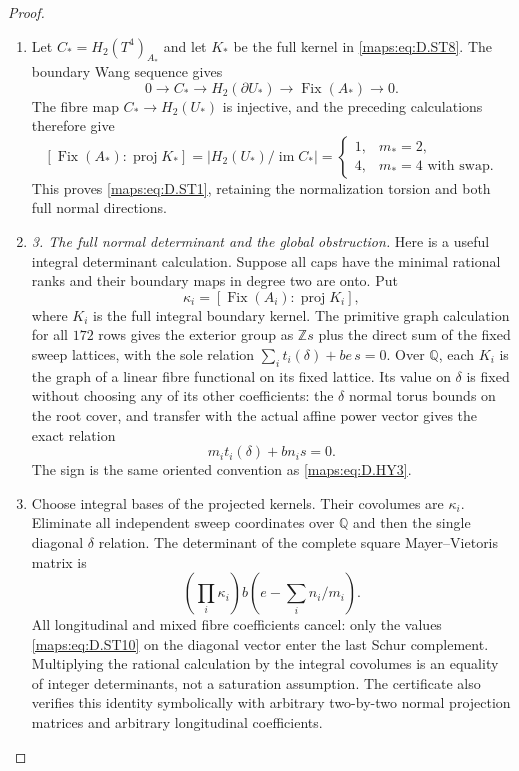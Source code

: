 \begin{proof}
\begin{enumerate}[label=\arabic*.,leftmargin=*]
\item Let $C_*=H_2(T^4)_{A_*}$ and let $K_*$ be the full kernel in
\eqref{maps:eq:D.ST8}. The boundary Wang sequence gives
\[
 0\longrightarrow C_*\longrightarrow H_2(\partial U_*)
        \longrightarrow\operatorname{Fix}(A_*)
        \longrightarrow0.
\]
The fibre map $C_*\to H_2(U_*)$ is injective, and the preceding
calculations therefore give
\[
 [\operatorname{Fix}(A_*):\operatorname{proj}K_*]
 =\bigl|H_2(U_*)/\operatorname{im}C_*\bigr|
 =\begin{cases}1,&m_*=2,\\4,&m_*=4\text{ with swap}.
   \end{cases}                                             \tag{D.ST9}\label{maps:eq:D.ST9}
\]
This proves \eqref{maps:eq:D.ST1}, retaining the normalization torsion and
both full normal directions.

\item \emph{3. The full normal determinant and the global obstruction.}
Here is a useful integral determinant calculation. Suppose all
caps have the minimal rational ranks and their boundary maps
in degree two are onto. Put
\[
 \kappa_i=[\operatorname{Fix}(A_i):
                         \operatorname{proj}K_i],
\]
where $K_i$ is the full integral boundary kernel. The primitive
graph calculation for all $172$ rows gives the exterior group
as $\mathbb Zs$ plus the direct sum of the fixed sweep lattices,
with the sole relation $\sum_i t_i(\delta)+be\,s=0$.
Over $\mathbb Q$, each $K_i$ is the graph of a linear fibre
functional on its fixed lattice. Its value on $\delta$ is fixed
without choosing any of its other coefficients: the
$\delta$ normal torus bounds on the root cover, and transfer
with the actual affine power vector gives the exact relation
\[
 m_i t_i(\delta)+bn_i s=0.                                 \tag{D.ST10}\label{maps:eq:D.ST10}
\]
The sign is the same oriented convention as \eqref{maps:eq:D.HY3}.

\item Choose integral bases of the projected kernels. Their
covolumes are $\kappa_i$. Eliminate all independent sweep
coordinates over $\mathbb Q$ and then the single diagonal
$\delta$ relation. The determinant of the complete square
Mayer--Vietoris matrix is
\[
 \left(\prod_i\kappa_i\right)
                   b\left(e-\sum_i n_i/m_i\right).         \tag{D.ST11}\label{maps:eq:D.ST11}
\]
All longitudinal and mixed fibre coefficients cancel: only
the values \eqref{maps:eq:D.ST10} on the diagonal vector enter the last
Schur complement. Multiplying the rational calculation by the
integral covolumes is an equality of integer determinants,
not a saturation assumption. The certificate also verifies
this identity symbolically with arbitrary two-by-two normal
projection matrices and arbitrary longitudinal coefficients.


\end{enumerate}
\end{proof}
